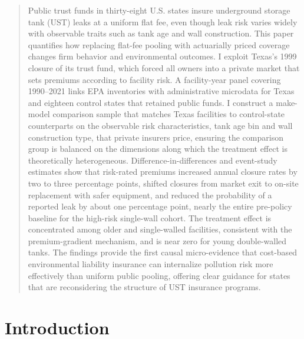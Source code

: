 \documentclass[
  12pt,
]{article}
\begin{document}
\begin{quote}
{\small \noindent Public trust funds in thirty-eight U.S. states insure underground storage tank
(UST) leaks at a uniform flat fee, even though leak risk varies widely with observable
traits such as tank age and wall construction. This paper quantifies how replacing
flat-fee pooling with actuarially priced coverage changes firm behavior and environmental
outcomes. I exploit Texas's 1999 closure of its trust fund, which forced all owners into
a private market that sets premiums according to facility risk. A facility-year panel
covering 1990--2021 links EPA inventories with administrative microdata for Texas and
eighteen control states that retained public funds. I construct a make-model comparison
sample that matches Texas facilities to control-state counterparts on the observable risk
characteristics, tank age bin and wall construction type, that private insurers price,
ensuring the comparison group is balanced on the dimensions along which the treatment
effect is theoretically heterogeneous. Difference-in-differences and event-study estimates
show that risk-rated premiums increased annual closure rates by two to three percentage
points, shifted closures from market exit to on-site replacement with safer equipment,
and reduced the probability of a reported leak by about one percentage point, nearly the
entire pre-policy baseline for the high-risk single-wall cohort. The treatment effect is
concentrated among older and single-walled facilities, consistent with the
premium-gradient mechanism, and is near zero for young double-walled tanks. The findings
provide the first causal micro-evidence that cost-based environmental liability insurance
can internalize pollution risk more effectively than uniform public pooling, offering
clear guidance for states that are reconsidering the structure of UST insurance programs.}
\end{quote}

\renewcommand{\thefootnote}{\arabic{footnote}}
\setcounter{footnote}{0}

\newpage

\section{Introduction}\label{introduction}
\end{document}
